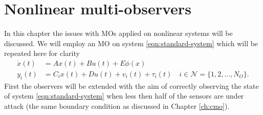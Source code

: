 \section{Nonlinear multi-observers}\label{ch:nonlinear-mos}
In this chapter the issues with MOs applied on nonlinear systems will be discussed. We will employ an MO on system \eqref{eqn:standard-system} which will be repeated here for clarity
\begin{equation*}
    \begin{split}
        \dot{x}(t) &= Ax(t) + Bu(t) + E\phi(x) \\
        y_i(t) &= C_ix(t) + Du(t) + v_i(t) + \tau_i(t) \quad i \in \mathcal{N} = \{1,2,\dots,N_O\}.
    \end{split}
\end{equation*}
First the observers will be extended with the aim of correctly observing the state of system \eqref{eqn:standard-system} when less then half of the sensors are under attack (the same boundary condition as discussed in Chapter \ref{ch:cmo}).

